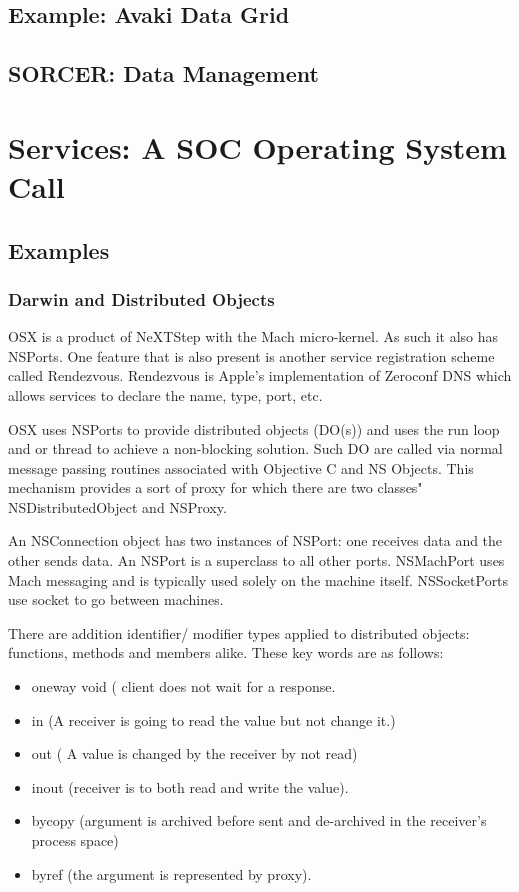 \documentclass[11pt]{article}
\begin{document}
 \subsection {Example: Avaki Data Grid}
 
 \subsection {SORCER: Data Management}
 
 
 \section {Services: A SOC Operating System Call}
 
 \subsection {Examples}
 \subsubsection {Darwin and Distributed Objects}
OSX is a product of NeXTStep with the Mach micro-kernel.  As such it also has NSPorts.  One feature that is also present is another service registration scheme called Rendezvous.    Rendezvous is Apple's implementation of Zeroconf DNS which allows services to declare the name, type, port, etc.  

OSX uses NSPorts to provide distributed objects (DO(s)) and uses the run loop and or thread  to achieve a non-blocking solution.  Such DO are called via normal message passing routines associated with Objective C and NS Objects.  This mechanism provides a sort of proxy for which there are two classes"  NSDistributedObject and NSProxy.  

An NSConnection object has two instances of NSPort: one receives data and the other sends data.   An NSPort is a superclass to all other ports.  NSMachPort uses Mach messaging and is typically used solely on the machine itself.  NSSocketPorts use socket to go between machines.  

There are addition identifier/ modifier types applied to distributed objects: functions, methods and members alike.  These key words are as follows:
\begin{itemize}
\item oneway void ( client does not wait for a response.
\item in (A receiver is going to read the value but not change it.)
\item out ( A value is changed by the receiver by not read)
\item inout (receiver is to both read and write  the value).
\item bycopy (argument is archived before sent and de-archived in the receiver's process space)
\item byref (the argument is represented by proxy).   
\end{itemize}
\end{document}
